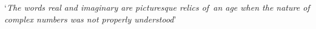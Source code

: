 \documentclass[preview]{standalone}
\begin{document}
\begin{center}
`\textit{The words real and imaginary are picturesque relics of\
        an age when the nature of complex numbers was not properly understood}'
\end{center}
\end{document}
